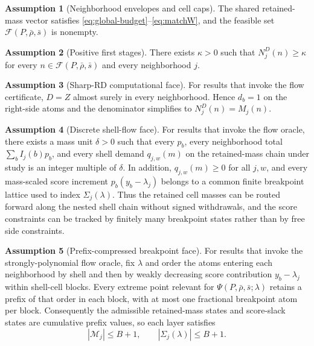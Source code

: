 \documentclass[11pt]{article}
\theoremstyle{definition}
\newtheorem{assumption}{Assumption}
\theoremstyle{plain}
\theoremstyle{remark}
\begin{document}
\begin{assumption}[Neighborhood envelopes and cell caps]\label{ass:budgets}
The shared retained-mass vector satisfies \eqref{eq:global-budget}--\eqref{eq:matchW}, and the
feasible set \(\mathcal F(P,\bar\rho,\bar s)\) is nonempty.
\end{assumption}

\begin{assumption}[Positive first stages]\label{ass:first-stage}
There exists \(\kappa>0\) such that \(N_j^D(n)\ge \kappa\) for every
\(n\in\mathcal F(P,\bar\rho,\bar s)\) and every neighborhood \(j\).
\end{assumption}

\begin{assumption}[Sharp-RD computational face]\label{ass:sharp-rd}
For results that invoke the flow certificate, \(D=Z\) almost surely in every neighborhood.
Hence \(d_b=1\) on the right-side atoms and the denominator simplifies to \(N_j^D(n)=M_j(n)\).
\end{assumption}

\begin{assumption}[Discrete shell-flow face]\label{ass:rational}
For results that invoke the flow oracle, there exists a mass unit \(\delta>0\) such that every
\(p_b\), every neighborhood total \(\sum_b I_j(b)p_b\), and every shell demand \(q_{j,w}(m)\) on
the retained-mass chain under study is an integer multiple of \(\delta\). In addition,
\(q_{j,w}(m)\ge0\) for all \(j,w\), and every mass-scaled score increment \(p_b(y_b-\lambda_j)\) belongs to a
common finite breakpoint lattice used to index \(\Sigma_j(\lambda)\). Thus the retained cell
masses can be routed forward along the nested shell chain without signed withdrawals, and the
score constraints can be tracked by finitely many breakpoint states rather than by free side
constraints.
\end{assumption}

\begin{assumption}[Prefix-compressed breakpoint face]\label{ass:compression}
For results that invoke the strongly-polynomial flow oracle, fix \(\lambda\) and order the atoms
entering each neighborhood by shell and then by weakly decreasing score contribution
\(y_b-\lambda_j\) within shell-cell blocks. Every extreme point relevant for
\(\Psi(P,\bar\rho,\bar s;\lambda)\) retains a prefix of that order in each block, with at most one
fractional breakpoint atom per block. Consequently the admissible retained-mass states and
score-slack states are cumulative prefix values, so each layer satisfies
\[
  |\mathcal M_j|\le B+1,
  \qquad
  |\Sigma_j(\lambda)|\le B+1.
\]
\end{assumption}
\end{document}
